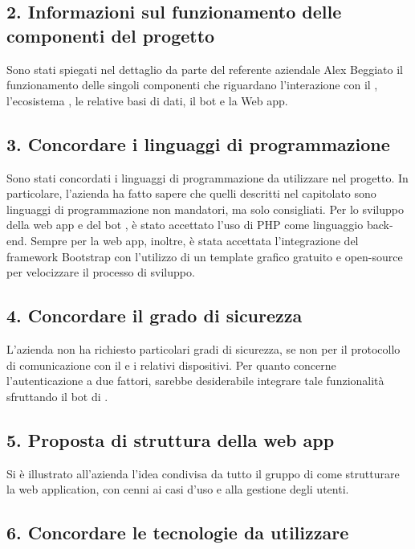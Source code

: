 	\subsection*{2. Informazioni sul funzionamento delle componenti del progetto}

	Sono stati spiegati nel dettaglio da parte del referente aziendale Alex Beggiato il funzionamento delle singoli componenti che riguardano l'interazione con il , l'ecosistema , le relative basi di dati, il bot  e la Web app.

	\subsection*{3. Concordare i linguaggi di programmazione}

	Sono stati concordati i linguaggi di programmazione da utilizzare nel progetto. In particolare, l'azienda ha fatto sapere che quelli descritti nel capitolato sono linguaggi di programmazione non mandatori, ma solo consigliati. Per lo sviluppo della web app e del bot , è stato accettato l'uso di PHP come linguaggio back-end. Sempre per la web app, inoltre, è stata accettata l'integrazione del framework Bootstrap con l'utilizzo di un template grafico gratuito e open-source per velocizzare il processo di sviluppo.

	\subsection*{4. Concordare il grado di sicurezza}

	L'azienda non ha richiesto particolari gradi di sicurezza, se non per il protocollo di comunicazione con il  e i relativi dispositivi. Per quanto concerne l'autenticazione a due fattori, sarebbe desiderabile integrare tale funzionalità sfruttando il bot di .

	\subsection*{5. Proposta di struttura della web app}

	Si è illustrato all'azienda l'idea condivisa da tutto il gruppo di come strutturare la web application, con cenni ai casi d'uso e alla gestione degli utenti.

	\subsection*{6. Concordare le tecnologie da utilizzare}

